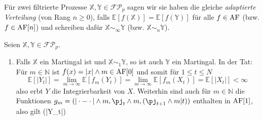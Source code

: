 \begin{definition}
Für zwei filtrierte Prozesse $\mathbb{X,Y} \in \mathcal{FP}_p$ sagen wir sie haben die gleiche \emph{adaptierte Verteilung} (von Rang $n\geq 0$), falls $\mathbb{E}[f(\mathbb{X})] = \mathbb{E}[f(\mathbb{Y})]$ für alle $f \in \AF$ (bzw. $f \in \AF[n]$) und schreiben dafür $\mathbb{X} \sim_\infty \mathbb{Y}$ (bzw. $\mathbb{X} \sim_n \mathbb{Y}$).
\end{definition}
\begin{example}
    Seien $\mathbb{X,Y} \in\mathcal{FP}_p$.
    \begin{enumerate}
        \item Falls $\mathbb{X}$ ein Martingal ist und $\mathbb{X}\sim_1 \mathbb{Y}$, so ist auch $\mathbb{Y}$ ein Martingal. In der Tat: Für $m \in \mathbb{N}$ ist $f(x)= |x| \wedge m \in \AF[0]$ und somit für $1\leq t \leq N$
        $$\mathbb{E}[|Y_t|] = \lim_{m\rightarrow\infty}\mathbb{E}[f_m(Y_t)]=\lim_{m\rightarrow\infty}\mathbb{E}[f_m(X_t)] = \mathbb{E}[|X_t|] < \infty$$
        also erbt $Y$ die Integrierbarkeit von $X$. Weiterhin sind auch für $m \in \mathbb{N}$ die Funktionen $g_m = (|\cdot - \cdot |\wedge m, \pj_t\wedge m, (\pj_{t+1}\wedge m\vert t))$ enthalten in $\AF[1]$, also gilt
        $$(|Y_t|)
    \end{enumerate}
\end{example}